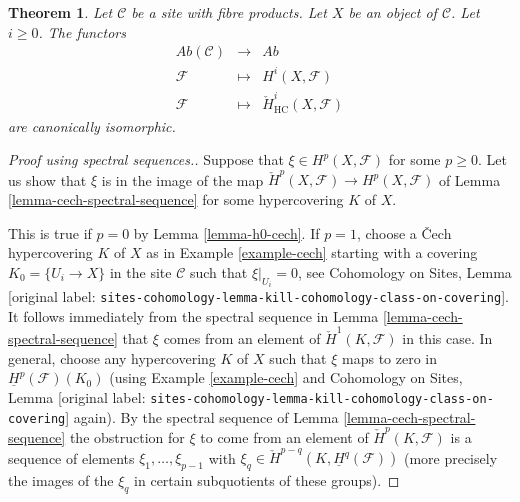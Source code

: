 \documentclass[10pt,a4paper]{article}
\theoremstyle{plain}
\newtheorem{theorem}[subsection]{Theorem}
\theoremstyle{definition}
\theoremstyle{remark}
\numberwithin{equation}{subsection}
\begin{document}
\begin{theorem}
\label{theorem-cohomology-hypercoverings}
Let $\mathcal{C}$ be a site with fibre products.
Let $X$ be an object of $\mathcal{C}$. Let $i \geq 0$.
The functors
\begin{eqnarray*}
\textit{Ab}(\mathcal{C}) & \longrightarrow & \textit{Ab} \\
\mathcal{F} & \longmapsto & H^i(X, \mathcal{F}) \\
\mathcal{F} & \longmapsto & \check{H}^i_{\text{HC}}(X, \mathcal{F})
\end{eqnarray*}
are canonically isomorphic.
\end{theorem}

\begin{proof}[Proof using spectral sequences.]
Suppose that $\xi \in H^p(X, \mathcal{F})$ for some $p \geq 0$.
Let us show that $\xi$ is in the image of the map
$\check{H}^p(X, \mathcal{F}) \to H^p(X, \mathcal{F})$ of
Lemma \ref{lemma-cech-spectral-sequence}
for some hypercovering $K$ of $X$.

\medskip\noindent
This is true if $p = 0$ by Lemma \ref{lemma-h0-cech}.
If $p = 1$, choose a {\v C}ech hypercovering $K$ of $X$ as in
Example \ref{example-cech} starting with a covering
$K_0 = \{U_i \to X\}$ in the site $\mathcal{C}$ such that
$\xi|_{U_i} = 0$, see
Cohomology on Sites,
Lemma \textnormal{[original label: \nolinkurl{sites-cohomology-lemma-kill-cohomology-class-on-covering}]}.
It follows immediately from the spectral sequence
in Lemma \ref{lemma-cech-spectral-sequence} that $\xi$ comes
from an element of $\check{H}^1(K, \mathcal{F})$ in this case.
In general, choose any hypercovering $K$ of $X$ such
that $\xi$ maps to zero in $\underline{H}^p(\mathcal{F})(K_0)$
(using Example \ref{example-cech} and
Cohomology on Sites,
Lemma \textnormal{[original label: \nolinkurl{sites-cohomology-lemma-kill-cohomology-class-on-covering}]}
again).
By the spectral sequence of Lemma \ref{lemma-cech-spectral-sequence}
the obstruction for $\xi$ to come from an element of
$\check{H}^p(K, \mathcal{F})$ is a sequence of elements
$\xi_1, \ldots, \xi_{p - 1}$ with
$\xi_q \in \check{H}^{p - q}(K, \underline{H}^q(\mathcal{F}))$
(more precisely the images of the $\xi_q$ in certain subquotients
of these groups).


\end{proof}
\end{document}
